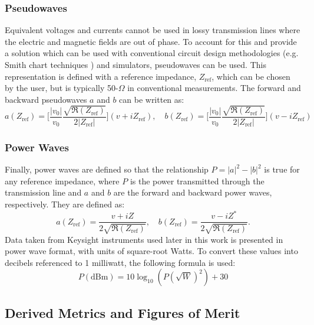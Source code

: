 \documentclass[../thesis/thesis.tex]{subfiles}
\begin{document}
\begin{refsection}
\subsubsection{Pseudowaves}

Equivalent voltages and currents cannot be used in lossy transmission lines where the electric and magnetic fields are out of phase. To account for this and provide a solution which can be used with conventional circuit design methodologies (e.g. Smith chart techniques \cite{Smith_1939}) and simulators, pseudowaves can be used. This representation is defined with a reference impedance, $Z_\textrm{ref}$, which can be chosen by the user, but is typically 50-$\Omega$ in conventional measurements. The forward and backward pseudowaves $a$ and $b$ can be written as:
\begin{equation}
a(Z_\textrm{ref})=\bigg[\dfrac{|v_0|}{v_0}\dfrac{\sqrt{\Re(Z_\textrm{ref})}}{2|Z_\textrm{ref}|}\bigg](v+iZ_\textrm{ref}),\quad b(Z_\textrm{ref})=\bigg[\dfrac{|v_0|}{v_0}\dfrac{\sqrt{\Re(Z_\textrm{ref})}}{2|Z_\textrm{ref}|}\bigg](v-iZ_\textrm{ref})
\end{equation}

\subsubsection{Power Waves}

Finally, power waves are defined so that the relationship $P = |a|^2 - |b|^2$ is true for any reference impedance, where $P$ is the power transmitted through the transmission line and $a$ and $b$ are the forward and backward power waves, respectively. They are defined as:
\begin{equation}
a(Z_\textrm{ref})=\dfrac{v+iZ}{2\sqrt{\Re(Z_\textrm{ref})}},\quad b(Z_\textrm{ref})=\dfrac{v-iZ^*}{2\sqrt{\Re(Z_\textrm{ref})}}.
\end{equation}
Data taken from Keysight instruments used later in this work is presented in power wave format, with units of square-root Watts. To convert these values into decibels referenced to 1 milliwatt, the following formula is used:
\begin{equation}
P(\textrm{dBm}) = 10\log_{10}(P(\sqrt{W})^2) + 30
\end{equation}

\subsection{Derived Metrics and Figures of Merit}


\end{refsection}
\end{document}
